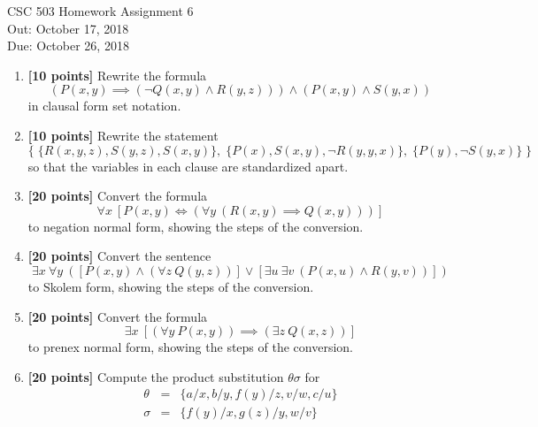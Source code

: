 \documentclass{article}
\begin{document}
\begin{center}
  {\LARGE CSC 503 Homework Assignment 6}\\[1pc]
  Out: October 17, 2018 \\
  Due: October 26, 2018 \\
\end{center}

\begin{enumerate}

\item \textbf{[10 points]} Rewrite the formula
  \begin{displaymath}
    (P(x,y) \implies (\neg Q(x,y) \land R(y,z))) \land (P(x,y) \land
    S(y,x))
\end{displaymath}
in clausal form set notation.

\item \textbf{[10 points]} Rewrite the statement
  \begin{displaymath}
    \{ \;
    \{ R(x,y,z), S(y,z), S(x,y) \},
    \;
    \{ P(x), S(x,y), \neg R(y,y,x) \},
    \;
    \{ P(y), \neg S(y,x) \}
    \; \}
  \end{displaymath}
  so that the variables in each clause are standardized apart.
  
\item \textbf{[20 points]} Convert the formula
  \begin{displaymath}
    \forall x\ [P(x,y) \iff (\forall y\ (R(x,y) \implies Q(x,y)))]
  \end{displaymath}
  to negation normal form, showing the steps of the conversion.
  
\item \textbf{[20 points]} Convert the sentence
  \begin{displaymath}
    \exists x\ \forall y\ \left( [P(x,y) \land (\forall z\ Q(y,z))] \lor
      [\exists u\ \exists v\ (P(x,u) \land R(y,v))] \right)
  \end{displaymath}
  to Skolem form, showing the steps of the conversion.

\item \textbf{[20 points]} Convert the formula
  \begin{displaymath}
    \exists x\ [(\forall y\ P(x,y)) \implies (\exists z\ Q(x,z))]
  \end{displaymath}
  to prenex normal form, showing the steps of the conversion.
  
\item \textbf{[20 points]} Compute the product substitution $\theta\sigma$
  for
  \begin{eqnarray*}
    \theta &=& \{ a/x, b/y, f(y)/z, v/w, c/u \} \\
    \sigma &=& \{ f(y)/x, g(z)/y, w/v \} 
  \end{eqnarray*}

\end{enumerate}
\end{document}
